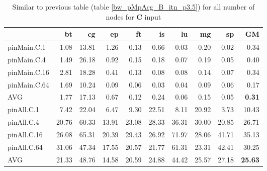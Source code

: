 \begin{table*}[]
\caption{Similar to previous table (table \ref{bw_pMpAcg_B_itn_p3.5}) for all number of nodes for \textbf{C} input}
\label{bw_pMpA_C_itn_p3.5}\begin{center}
\begin{tabular}{|l|rrrrrrrr|r|}
\hline
              &    bt &    cg &    ep &    ft &    is &    lu &    mg &    sp &    GM \\
\hline
 pinMain.C.1  &  1.08 & 13.81 &  1.26 &  0.13 &  0.66 &  0.03 &  0.20 &  0.02 &  0.34 \\
 pinMain.C.4  &  1.49 & 26.18 &  0.92 &  0.15 &  0.18 &  0.07 &  0.19 &  0.05 &  0.40 \\
 pinMain.C.16 &  2.81 & 18.28 &  0.41 &  0.13 &  0.08 &  0.08 &  0.14 &  0.07 &  0.34 \\
 pinMain.C.64 &  1.69 & 10.24 &  0.09 &  0.06 &  0.03 &  0.04 &  0.09 &  0.06 &  0.17 \\
 \hline
 AVG          &  1.77 & 17.13 &  0.67 &  0.12 &  0.24 &  0.06 &  0.15 &  0.05 &  \textbf{0.31} \\
 \hline
 pinAll.C.1   &  7.42 & 22.04 &  6.47 &  9.30 & 22.51 &  8.11 & 20.92 &  3.73 & 10.43 \\
 pinAll.C.4   & 20.76 & 60.33 & 13.91 & 23.08 & 28.33 & 36.31 & 30.00 & 20.85 & 26.71 \\
 pinAll.C.16  & 26.08 & 65.31 & 20.39 & 29.43 & 26.92 & 71.97 & 28.06 & 41.71 & 35.13 \\
 pinAll.C.64  & 31.06 & 47.34 & 17.55 & 20.57 & 21.77 & 61.31 & 23.31 & 42.41 & 30.25 \\
 \hline
 AVG          & 21.33 & 48.76 & 14.58 & 20.59 & 24.88 & 44.42 & 25.57 & 27.18 & \textbf{25.63} \\
\hline
\end{tabular}
\end{center}
\end{table*}
